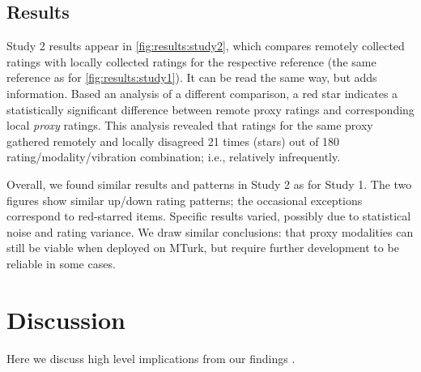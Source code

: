 

\subsection {Results}

Study 2 results appear in \autoref{fig:results:study2},
which compares remotely collected ratings with locally collected ratings for the respective reference (the same reference as for \autoref{fig:results:study1}). It can be read the same way, but adds information.
Based an analysis of a different comparison, a red star indicates a statistically significant difference between remote proxy ratings and corresponding local \textit{proxy} ratings.
This analysis revealed that ratings for the same proxy gathered remotely and locally disagreed 21 times (stars) out of 180 rating/modality/vibration combination; i.e., relatively infrequently.

Overall, we found similar results and patterns in Study 2 as for Study 1. The two figures show similar up/down rating patterns; the occasional exceptions correspond to red-starred items.
Specific results varied, possibly due to statistical noise and rating variance.
We draw similar conclusions: that proxy modalities can still be viable when deployed on MTurk, but require further development to be reliable in some cases.

		
\section{Discussion}
Here we discuss high level implications from our findings .

